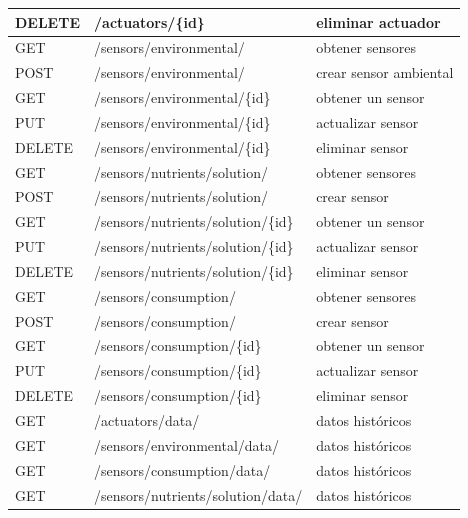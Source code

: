 \begin{table}[H]
\begin{tabular}{l l l}
        DELETE          & /actuators/\{id\}                  & eliminar actuador      \\
        \midrule
        GET             & /sensors/environmental/            & obtener sensores       \\
        POST            & /sensors/environmental/            & crear sensor ambiental \\
        GET             & /sensors/environmental/\{id\}      & obtener un sensor      \\
        PUT             & /sensors/environmental/\{id\}      & actualizar sensor      \\
        DELETE          & /sensors/environmental/\{id\}      & eliminar sensor        \\
        \midrule
        GET             & /sensors/nutrients/solution/       & obtener sensores       \\
        POST            & /sensors/nutrients/solution/       & crear sensor           \\
        GET             & /sensors/nutrients/solution/\{id\} & obtener un sensor      \\
        PUT             & /sensors/nutrients/solution/\{id\} & actualizar sensor      \\
        DELETE          & /sensors/nutrients/solution/\{id\} & eliminar sensor        \\
        \midrule
        GET             & /sensors/consumption/              & obtener sensores       \\
        POST            & /sensors/consumption/              & crear sensor           \\
        GET             & /sensors/consumption/\{id\}        & obtener un sensor      \\
        PUT             & /sensors/consumption/\{id\}        & actualizar sensor      \\
        DELETE          & /sensors/consumption/\{id\}        & eliminar sensor        \\
        \midrule
        GET             & /actuators/data/                   & datos históricos       \\
        GET             & /sensors/environmental/data/       & datos históricos       \\
        GET             & /sensors/consumption/data/         & datos históricos       \\
        GET             & /sensors/nutrients/solution/data/  & datos históricos       \\
        \bottomrule
        \hline
    \end{tabular}
    \label{tab:endpoints}
\end{table}

